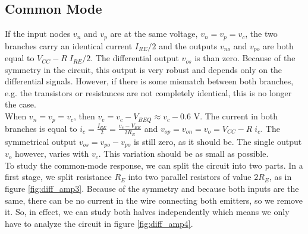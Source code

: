 \subsection{Common Mode}
If the input nodes $v_n$ and $v_p$ are at the same voltage, $v_n = v_p = v_c$, the two branches carry an identical current $I_{RE}/2$ and the  outputs $v_{no}$ and $v_{po}$ are both equal to $V_{CC} - R\;I_{RE}/2$. The differential output $v_{os}$ is than zero. Because of the symmetry in the circuit, this output is very robust and depends only on the differential signals. However, if there is some mismatch between both branches, e.g. the transistors or resistances are not completely identical, this is no longer the case.\\
When $v_n = v_p = v_c$, then $v_e = v_c - V_{BEQ} \approx v_c - 0.6$ V. The current in both branches is equal to $i_c = \frac{ I_{RE}}{2} = \frac{v_e - V_{EE}} {2R_E}$ and $v_{op} = v_{on} = v_o = V_{CC} - R \; i_c$. The symmetrical output $v_{os} = v_{po} -v_{po}$ is still zero, as it should be. The single output $v_o$ however, varies with $v_c$. This variation should be as small as possible.\\
To study the common-mode response, we can split the circuit into two parts. In a first stage, we split resistance $R_E$ into two parallel resistors of value $2R_E$, as in figure \ref{fig:diff_amp3}. Because of the symmetry and because both inputs are the same, there can be no current in the wire connecting both emitters, so we remove it. So, in effect, we can study both halves independently which means we only have to analyze the circuit in figure \ref{fig:diff_amp4}.

